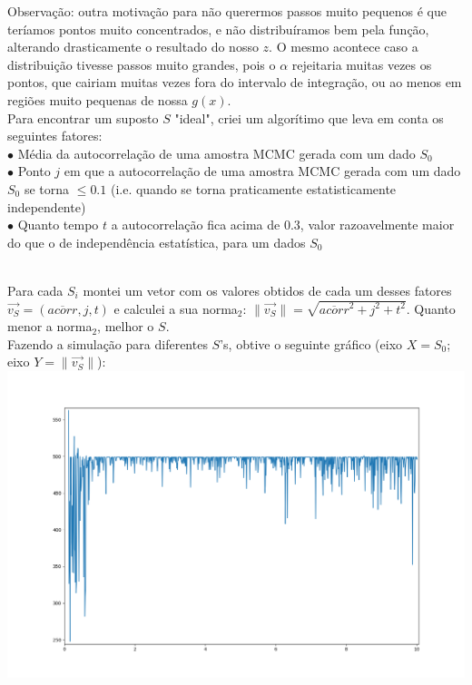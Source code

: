 \documentclass[pt12]{article}
\begin{document}
\newpage

Observação: outra motivação para não querermos passos muito pequenos é que teríamos pontos muito concentrados, e não distribuíramos bem pela função, alterando drasticamente o resultado do nosso $z$. O mesmo acontece caso a distribuição tivesse passos muito grandes, pois o $\alpha$ rejeitaria muitas vezes os pontos, que cairiam muitas vezes fora do intervalo de integração, ou ao menos em regiões muito pequenas de nossa $g(x)$.\\

Para encontrar um suposto $S$ "ideal", criei um algorítimo que leva em conta os seguintes fatores:\\

\indent $\bullet$ Média da autocorrelação de uma amostra MCMC gerada com um dado $S_0$\\
\indent $\bullet$ Ponto $j$ em que a autocorrelação de uma amostra MCMC gerada com um dado $S_0$ se torna $\leq 0.1$ (i.e. quando se torna praticamente estatisticamente independente)\\
\indent $\bullet$ Quanto tempo $t$ a autocorrelação fica acima de $0.3$, valor razoavelmente maior do que o de independência estatística, para um dados $S_0$\\
\

Para cada $S_i$ montei um vetor com os valores obtidos de cada um desses fatores $\vec{v_S} = (\overline{acorr}, j, t)$ e calculei a sua norma$_2$: $\parallel \vec{v_S}\parallel = \sqrt{\overline{acorr}^2 + j^2 + t^2}$. Quanto menor a norma$_2$, melhor o $S$.\\

Fazendo a simulação para diferentes $S$'s, obtive o seguinte gráfico (eixo $X = S_0$; eixo $Y = \parallel \vec{v_S}\parallel$):\\

\includegraphics[scale=0.475]{Autocorrelacao_vs_Sigma.png}\\
\end{document}
